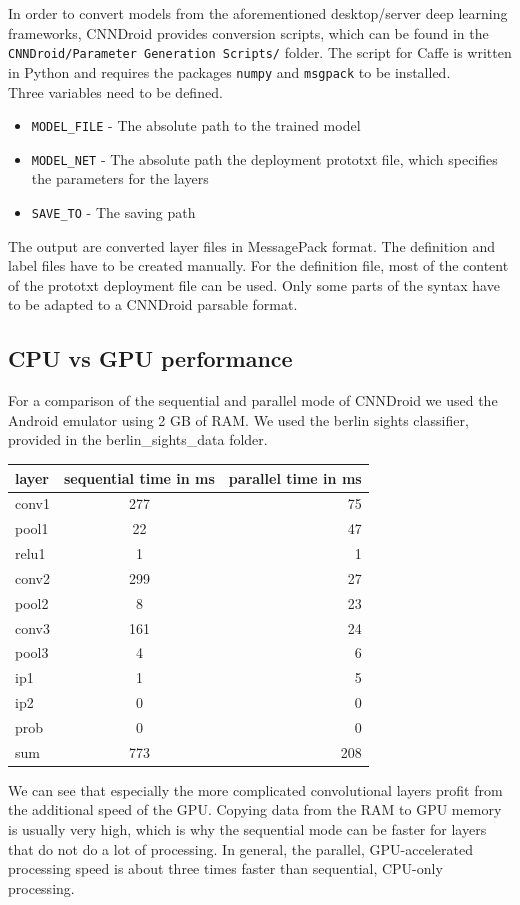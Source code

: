 In order to convert models from the aforementioned desktop/server deep learning frameworks, CNNDroid provides conversion scripts, which can be found in the \texttt{CNNDroid/Parameter Generation Scripts/} folder. The script for Caffe is written in Python and requires the packages \lstinline[language=python]{numpy} and \lstinline[language=python]{msgpack} to be installed.\\
Three variables need to be defined.
\begin{itemize}
  \item{\texttt{MODEL\_FILE} - The absolute path to the trained model}
  \item{\texttt{MODEL\_NET} - The absolute path the deployment prototxt file, which specifies the parameters for the layers}
  \item{\texttt{SAVE\_TO} - The saving path}
\end{itemize}
The output are converted layer files in MessagePack format. The definition and label files have to be created manually. For the definition file, most of the content of the prototxt deployment file can be used. Only some parts of the syntax have to be adapted to a CNNDroid parsable format.\\
\newpage
\subsection{CPU vs GPU performance}
For a comparison of the sequential and parallel mode of CNNDroid we used the Android emulator using 2 GB of RAM. We used the berlin sights classifier, provided in the berlin\_sights\_data folder.

\begin{center}
  \begin{tabular}{l|c|r}
    layer & sequential time in ms & parallel time in ms \\\hline
    conv1 & 277 & 75\\
    pool1 & 22 & 47\\
    relu1 & 1 & 1\\
    conv2 & 299 & 27\\
    pool2 & 8 & 23\\
    conv3 & 161 & 24\\
    pool3 & 4 & 6\\
    ip1 & 1 & 5\\
    ip2 & 0 & 0\\
    prob & 0 & 0\\\hline
    sum & 773 & 208\\
  \end{tabular}
\end{center}

We can see that especially the more complicated convolutional layers profit from the additional speed of the GPU. Copying data from the RAM to GPU memory is usually very high, which is why the sequential mode can be faster for layers that do not do a lot of processing. In general, the parallel, GPU-accelerated processing speed is about three times faster than sequential, CPU-only processing.